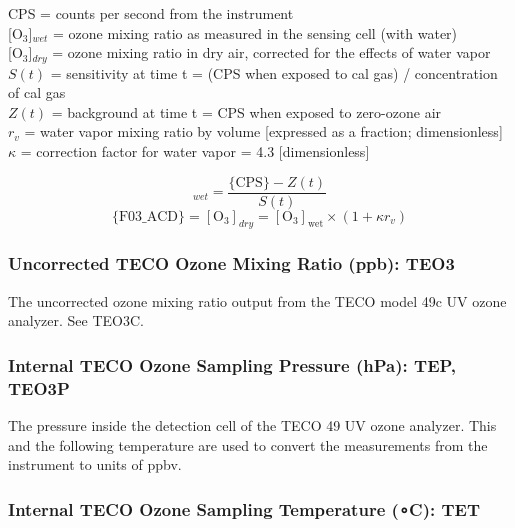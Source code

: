 \documentclass[
]{book}
\begin{document}
CPS = counts per second from the instrument\\
{[}O\(_{3}\){]}\(_{wet}\) = ozone mixing ratio as measured in the sensing
cell (with water)\\
{[}O\(_{3}\){]}\(_{dry}\) = ozone mixing ratio in dry air, corrected
for the effects of water vapor\\
\(S(t)\) = sensitivity at time t = (CPS when exposed to cal gas)
/ concentration of cal gas\\
\(Z(t)\) = background at time t = CPS when exposed to zero-ozone
air\\
\(r_v\) = water vapor mixing ratio by volume
{[}expressed as a fraction; dimensionless{]}\\
\(\kappa\) = correction factor for water vapor = 4.3 {[}dimensionless{]}

\begin{equation}
[\mathrm{O}_{3}]_{wet}=\frac{\mathrm{\{CPS\}}-Z(t)}{S(t)}
\label{eq:O3box1}
\end{equation}
\begin{equation}
\mathrm{\{F03\_ACD\}}=[\mathrm{O_{3}}]_{dry} = \mathrm{[O_{3}]_{wet}}\times(1+\kappa r_{v})
\label{eq:O3box2}
\end{equation}

\hypertarget{te03}{%
\subsubsection*{Uncorrected TECO Ozone Mixing Ratio (ppb): TEO3}\label{te03}}

The uncorrected ozone mixing ratio output from the TECO model 49c UV ozone analyzer. See TEO3C.

\hypertarget{tep}{%
\subsubsection*{Internal TECO Ozone Sampling Pressure (hPa): TEP, TEO3P}\label{tep}}

The pressure inside the detection cell of the TECO 49 UV ozone analyzer. This and the following temperature are used to convert the measurements from the instrument to units of ppbv.

\hypertarget{tet}{%
\subsubsection*{\texorpdfstring{Internal TECO Ozone Sampling Temperature ({∘C}): TET}{Internal TECO Ozone Sampling Temperature (∘C): TET}}\label{tet}}
\end{document}
